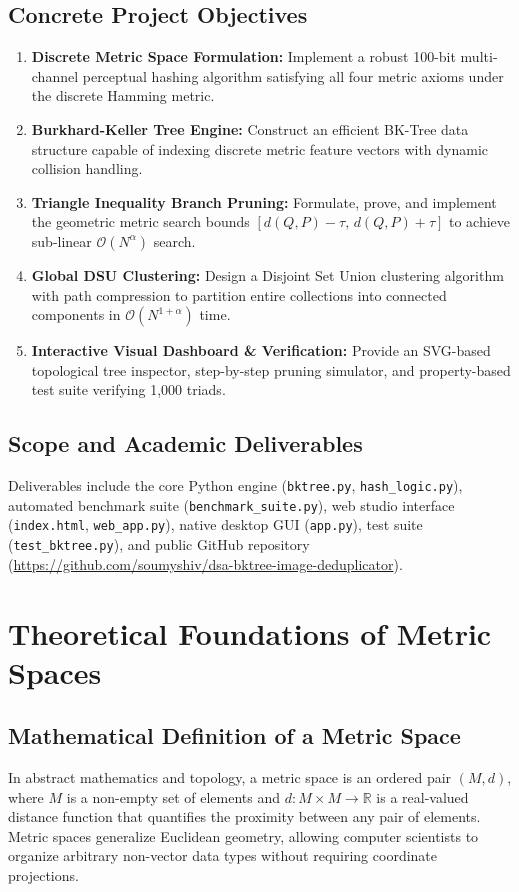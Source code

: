 \documentclass[11pt,a4paper]{article}
\begin{document}
\subsection{Concrete Project Objectives}
\begin{enumerate}
    \item \textbf{Discrete Metric Space Formulation:} Implement a robust 100-bit multi-channel perceptual hashing algorithm satisfying all four metric axioms under the discrete Hamming metric.
    \item \textbf{Burkhard-Keller Tree Engine:} Construct an efficient BK-Tree data structure capable of indexing discrete metric feature vectors with dynamic collision handling.
    \item \textbf{Triangle Inequality Branch Pruning:} Formulate, prove, and implement the geometric metric search bounds $[d(Q, P) - \tau, \, d(Q, P) + \tau]$ to achieve sub-linear $\mathcal{O}(N^\alpha)$ search.
    \item \textbf{Global DSU Clustering:} Design a Disjoint Set Union clustering algorithm with path compression to partition entire collections into connected components in $\mathcal{O}(N^{1+\alpha})$ time.
    \item \textbf{Interactive Visual Dashboard \& Verification:} Provide an SVG-based topological tree inspector, step-by-step pruning simulator, and property-based test suite verifying 1,000 triads.
\end{enumerate}

\subsection{Scope and Academic Deliverables}
Deliverables include the core Python engine (\texttt{bktree.py}, \texttt{hash\_logic.py}), automated benchmark suite (\texttt{benchmark\_suite.py}), web studio interface (\texttt{index.html}, \texttt{web\_app.py}), native desktop GUI (\texttt{app.py}), test suite (\texttt{test\_bktree.py}), and public GitHub repository (\url{https://github.com/soumyshiv/dsa-bktree-image-deduplicator}).

\section{Theoretical Foundations of Metric Spaces}
\subsection{Mathematical Definition of a Metric Space}
In abstract mathematics and topology, a metric space is an ordered pair $(M, d)$, where $M$ is a non-empty set of elements and $d: M \times M \to \mathbb{R}$ is a real-valued distance function that quantifies the proximity between any pair of elements. Metric spaces generalize Euclidean geometry, allowing computer scientists to organize arbitrary non-vector data types without requiring coordinate projections.
\end{document}

